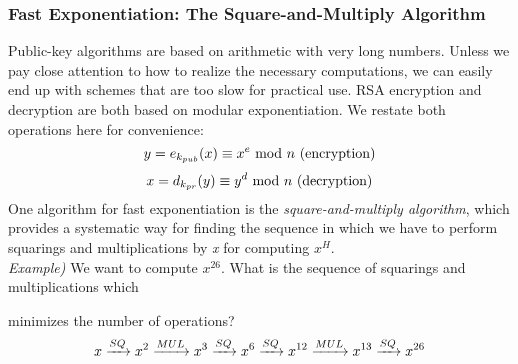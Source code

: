 \newpage
\subsubsection{Fast Exponentiation: The Square-and-Multiply Algorithm}
Public-key algorithms are based on arithmetic with very long numbers. Unless we pay close attention to how to realize the necessary computations, we can easily end up with schemes that are too slow for practical use. RSA encryption and decryption are both based on modular exponentiation. We restate both operations here for convenience:
$$y=e_{k_{pub}}(x)\equiv x^e\text{ mod } n\text{ (encryption)}$$
$$x=d_{k_{pr}}(y)\equiv y^d\text{ mod } n\text{ (decryption)}$$
One algorithm for fast exponentiation is the \textit{square-and-multiply algorithm}, which provides a systematic way for finding the sequence in which we have to perform squarings and multiplications by \textit{x} for computing \nolinebreak$x^H$.\\

\textit{Example)} We want to compute $x^{26}$. What is the sequence of squarings and multiplications which

minimizes the number of operations?
$$x\xrightarrow{SQ} x^2\xrightarrow{MUL} x^3\xrightarrow{SQ} x^6\xrightarrow{SQ} x^{12}\xrightarrow{MUL} x^{13}\xrightarrow{SQ} x^{26}$$

